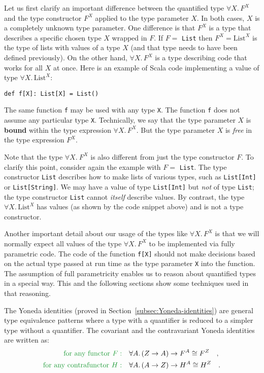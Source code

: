 Let us first clarify an important difference between the quantified
type $\forall X.\,F^{X}$ and the type constructor $F^{X}$ applied
to the type parameter $X$. In both cases, $X$ is a completely unknown
type parameter. One difference is that $F^{X}$ is a type that describes
a specific chosen type $X$ wrapped in $F$. If $F=$ \lstinline!List!
then $F^{X}=\text{List}^{X}$ is the type of lists with values of
a type $X$ (and that type needs to have been defined previously).
On the other hand, $\forall X.\,F^{X}$ is a type describing code
that works for all $X$ at once. Here is an example of Scala code
implementing a value of type $\forall X.\,\text{List}^{X}$:
\begin{lstlisting}
def f[X]: List[X] = List()
\end{lstlisting}
The same function \lstinline!f! may be used with any type \lstinline!X!.
The function \lstinline!f! does not assume any particular type \lstinline!X!.
Technically, we say that the type parameter $X$ is \textbf{bound}
within the type expression $\forall X.\,F^{X}$. But the type parameter
$X$ is \emph{free} in the type expression $F^{X}$.

Note that the type $\forall X.~F^{X}$ is also different from just
the type constructor $F$. To clarify this point, consider again the
example with $F=$ \lstinline!List!. The type constructor \lstinline!List!
describes how to make lists of various types, such as \lstinline!List[Int]!
or \lstinline!List[String]!. We may have a value of type \lstinline!List[Int]!
but \emph{not} of type \lstinline!List!; the type constructor \lstinline!List!
cannot \emph{itself} describe values. By contrast, the type $\forall X.\,\text{List}^{X}$
has values (as shown by the code snippet above) and is not a type
constructor.

Another important detail about our usage of the types like $\forall X.\,F^{X}$
is that we will normally expect all values of the type $\forall X.\,F^{X}$
to be implemented via fully parametric code. The code of the function
\lstinline!f[X]! should not make decisions based on the actual type
passed at run time as the type parameter \lstinline!X! into the function.
The assumption of full parametricity enables us to reason about quantified
types in a special way. This and the following sections show some
techniques used in that reasoning.

The Yoneda identities (proved in Section~\ref{subsec:Yoneda-identities})
are general type equivalence patterns where a type with a quantifier
is reduced to a simpler type without a quantifier. The covariant and
the contravariant Yoneda identities are written as:
\begin{align*}
{\color{greenunder}\text{for any functor }F:}\quad & \forall A.\,(Z\rightarrow A)\rightarrow F^{A}\cong F^{Z}\quad,\\
{\color{greenunder}\text{for any contrafunctor }H:}\quad & \forall A.\,(A\rightarrow Z)\rightarrow H^{A}\cong H^{Z}\quad.
\end{align*}

